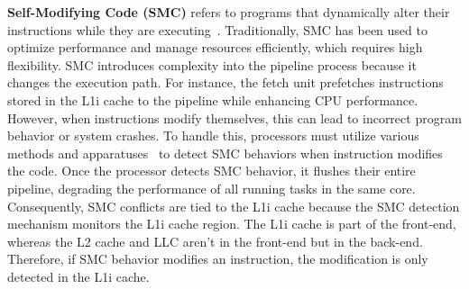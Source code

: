 \noindent\textbf{Self-Modifying Code (SMC)} refers to programs that dynamically alter their instructions while they are executing~\cite{cai2007certified}. Traditionally, SMC has been used to optimize performance and manage resources efficiently, which requires high flexibility. SMC introduces complexity into the pipeline process because it changes the execution path. For instance, the fetch unit prefetches instructions stored in the L1i cache to the pipeline while enhancing CPU performance. However, when instructions modify themselves, this can lead to incorrect program behavior or system crashes. To handle this, processors must utilize various methods and apparatuses~\cite{zaidi2001system,murty2002apparatus,kyker2003method,botacin2020self} to detect SMC behaviors when instruction modifies the code. Once the processor detects SMC behavior, it flushes their entire pipeline, degrading the performance of all running tasks in the same core. Consequently, SMC conflicts are tied to the L1i cache because the SMC detection mechanism monitors the L1i cache region. The L1i cache is part of the front-end, whereas the L2 cache and LLC aren't in the front-end but in the back-end. Therefore, if SMC behavior modifies an instruction, the modification is only detected in the L1i cache.